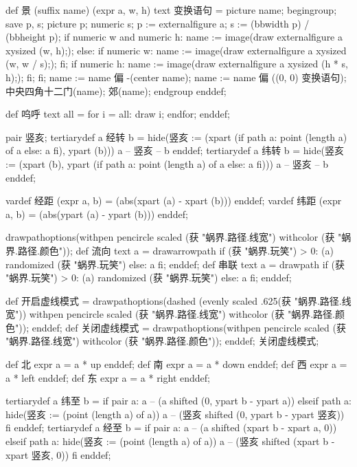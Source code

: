 \startMPinclusions[+]
def 景 (suffix name) (expr a, w, h) text 变换语句 =
  picture name;
  begingroup;
  save p, s; picture p; numeric s;
  p := externalfigure a;
  s := (bbwidth p) / (bbheight p);
  if numeric w and numeric h:
    name := image(draw externalfigure a xysized (w, h););
  else:
    if numeric w:
      name := image(draw externalfigure a xysized (w, w / s););
    fi;
    if numeric h:
       name := image(draw externalfigure a xysized (h * s, h););
    fi;
  fi;
  name := name 偏 -(center name); %
  name := name 偏 ((0, 0) 变换语句); 
  中央四角十二门(name); 郊(name);
  endgroup
enddef;

def 呜呼 text all =
  for i = all: draw i; endfor;
enddef;
\stopMPinclusions

\startMPinclusions[+]
pair 竖亥;
tertiarydef a 经转 b =
  hide(竖亥 := (xpart (if path a: point (length a) of a else: a fi), ypart (b)))
  a -- 竖亥 -- b
enddef;
tertiarydef a 纬转 b =
  hide(竖亥 := (xpart (b), ypart (if path a: point (length a) of a else: a fi)))
  a --  竖亥 -- b
enddef;
\stopMPinclusions

\startMPinclusions[+]
vardef 经距 (expr a, b) = (abs(xpart (a) - xpart (b))) enddef;
vardef 纬距 (expr a, b) = (abs(ypart (a) - ypart (b))) enddef;
\stopMPinclusions

\startMPinclusions[+]
drawpathoptions(withpen pencircle scaled (获 "蜗界.路径.线宽") withcolor (获 "蜗界.路径.颜色"));
def 流向 text a =
  drawarrowpath if (获 "蜗界.玩笑") > 0: (a) randomized (获 "蜗界.玩笑") else: a fi;
enddef;
def 串联 text a =
  drawpath if (获 "蜗界.玩笑") > 0: (a) randomized (获 "蜗界.玩笑") else: a fi;  
enddef;
\stopMPinclusions

\startMPinclusions[+]
def 开启虚线模式 =
  drawpathoptions(dashed (evenly scaled .625(获 "蜗界.路径.线宽"))
                  withpen pencircle scaled (获 "蜗界.路径.线宽")
                  withcolor (获 "蜗界.路径.颜色"));
enddef;
def 关闭虚线模式 =
  drawpathoptions(withpen pencircle scaled (获 "蜗界.路径.线宽")
                  withcolor (获 "蜗界.路径.颜色"));
enddef;
关闭虚线模式;
\stopMPinclusions

\startMPinclusions[+]
def 北 expr a = a * up enddef; 
def 南 expr a = a * down enddef;
def 西 expr a = a * left enddef; 
def 东 expr a = a * right enddef;

tertiarydef a 纬至 b = 
  if pair a:
    a -- (a shifted (0, ypart b - ypart a))
  elseif path a:
    hide(竖亥 := (point (length a) of a))
    a -- (竖亥 shifted (0, ypart b - ypart 竖亥))
  fi
enddef;
tertiarydef a 经至 b = 
  if pair a:
    a -- (a shifted (xpart b - xpart a, 0))
  elseif path a:
    hide(竖亥 := (point (length a) of a))
    a -- (竖亥 shifted (xpart b - xpart 竖亥, 0))
  fi
enddef;
\stopMPinclusions

